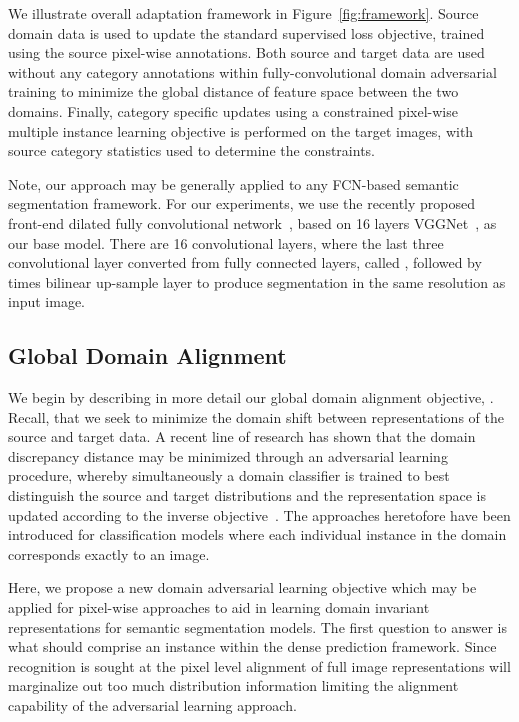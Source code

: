 \documentclass[10pt,twocolumn,letterpaper]{article}
\begin{document}
We illustrate overall adaptation framework in Figure~\ref{fig:framework}. Source domain data is used to update the standard supervised loss objective, trained using the source pixel-wise annotations. Both source and target data are used without any category annotations within fully-convolutional domain adversarial training to minimize the global distance of feature space between the two domains. Finally, category specific updates using a constrained pixel-wise multiple instance learning objective is performed on the target images, with source category statistics used to determine the constraints. 











Note, our approach may be generally applied to any FCN-based semantic segmentation framework. For our experiments, we use the recently proposed front-end dilated fully convolutional network~\cite{yu2016multi}, based on 16 layers VGGNet~\cite{simonyan2015very}, as our base model. There are 16 convolutional layers, where the last three convolutional layer converted from fully connected layers, called , followed by  times bilinear up-sample layer to produce segmentation in the same resolution as input image.

\subsection{Global Domain Alignment}\label{sec:global}

We begin by describing in more detail our global domain alignment objective, . 
Recall, that we seek to minimize the domain shift between representations of the source and target data. 
A recent line of research has shown that the domain discrepancy distance may be minimized through an adversarial learning procedure, whereby simultaneously a domain classifier is trained to best distinguish the source and target distributions and the representation space is updated according to the inverse objective~\cite{tzeng2015simultaneous,chen2016synthesizing,ganin2016domain}. The approaches heretofore have been introduced for classification models where each individual instance in the domain corresponds exactly to an image. 

Here, we propose a new domain adversarial learning objective which may be applied for pixel-wise approaches to aid in learning domain invariant representations for semantic segmentation models. The first question to answer is what should comprise an instance within the dense prediction framework. Since recognition is sought at the pixel level alignment of full image representations will marginalize out too much distribution information limiting the alignment capability of the adversarial learning approach. 
\end{document}
